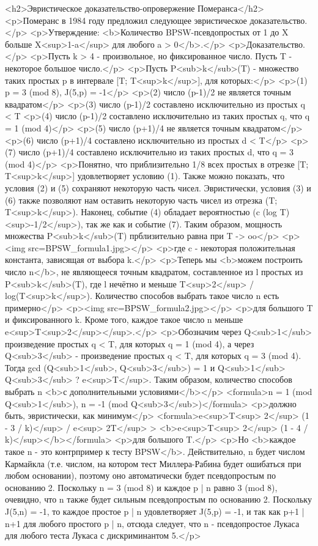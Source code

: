 <h2>Эвристическое доказательство-опровержение Померанса</h2>
<p>Померанс в 1984 году предложил следующее эвристическое доказательство.</p>
<p>Утверждение: <b>Количество BPSW-псевдопростых от 1 до X больше X<sup>1-a</sup> для любого a > 0</b>.</p>
<p>Доказательство.</p>
<p>Пусть k > 4 - произвольное, но фиксированное число. Пусть T - некоторое большое число.</p>
<p>Пусть P<sub>k</sub>(T) - множество таких простых p в интервале [T; T<sup>k</sup>], для которых:</p>
<p>(1) p = 3 (mod 8), J(5,p) = -1</p>
<p>(2) число (p-1)/2 не является точным квадратом</p>
<p>(3) число (p-1)/2 составлено исключительно из простых q < T
<p>(4) число (p-1)/2 составлено исключительно из таких простых q, что q = 1 (mod 4)</p>
<p>(5) число (p+1)/4 не является точным квадратом</p>
<p>(6) число (p+1)/4 составлено исключительно из простых d < T</p>
<p>(7) число (p+1)/4 составлено исключительно из таких простых d, что q = 3 (mod 4)</p>
<p>Понятно, что приблизительно 1/8 всех простых в отрезке [T; T<sup>k</sup>] удовлетворяет условию (1). Также можно показать, что условия (2) и (5) сохраняют некоторую часть чисел. Эвристически, условия (3) и (6) также позволяют нам оставить некоторую часть чисел из отрезка (T; T<sup>k</sup>). Наконец, событие (4) обладает вероятностью (c (log T)<sup>-1/2</sup>), так же как и событие (7). Таким образом, мощность множества P<sub>k</sub>(T) прблизительно равна при T -> oo</p>
<p><img src=BPSW_formula1.jpg></p>
<p>где c - некоторая положительная константа, зависящая от выбора k.</p>
<p>Теперь мы <b>можем построить число n</b>, не являющееся точным квадратом, составленное из l простых из P<sub>k</sub>(T), где l нечётно и меньше T<sup>2</sup> / log(T<sup>k</sup>). Количество способов выбрать такое число n есть примерно</p>
<p><img src=BPSW_formula2.jpg></p>
<p>для большого T и фиксированного k. Кроме того, каждое такое число n меньше e<sup>T<sup>2</sup></sup>.</p>
<p>Обозначим через Q<sub>1</sub> произведение простых q < T, для которых q = 1 (mod 4), а через Q<sub>3</sub> - произведение простых q < T, для которых q = 3 (mod 4). Тогда gcd (Q<sub>1</sub>, Q<sub>3</sub>) = 1 и Q<sub>1</sub> Q<sub>3</sub> ? e<sup>T</sup>. Таким образом, количество способов выбрать n <b>с дополнительными условиями</b></p>
<formula>n = 1 (mod Q<sub>1</sub>), n = -1 (mod Q<sub>3</sub>)</formula>
<p>должно быть, эвристически, как минимум</p>
<formula>e<sup>T<sup> 2</sup> (1 - 3 / k)</sup> / e<sup> 2T</sup> > <b>e<sup>T<sup> 2</sup> (1 - 4 / k)</sup></b></formula>
<p>для большого T.</p>
<p>Но <b>каждое такое n - это контрпример к тесту BPSW</b>. Действительно, n будет числом Кармайкла (т.е. числом, на котором тест Миллера-Рабина будет ошибаться при любом основании), поэтому оно автоматически будет псевдопростым по основанию 2. Поскольку n = 3 (mod 8) и каждое p | n равно 3 (mod 8), очевидно, что n также будет сильным псевдопростым по основанию 2. Поскольку J(5,n) = -1, то каждое простое p | n удовлетворяет J(5,p) = -1, и так как p+1 | n+1 для любого простого p | n, отсюда следует, что n - псевдопростое Лукаса для любого теста Лукаса с дискриминантом 5.</p>
